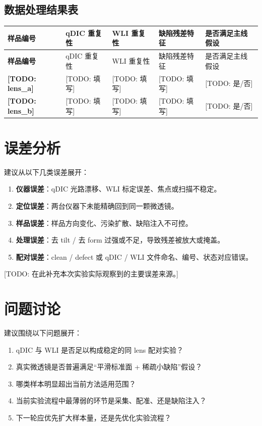 \documentclass[UTF8,a4paper,11pt]{ctexart}
\newcommand{\TODO}[1]{\textcolor{red!70!black}{[TODO: #1]}}
\begin{document}
\subsection{数据处理结果表}

\begin{longtable}{>{\bfseries}p{} p{} p{} p{} p{}}
\toprule
样品编号 & qDIC 重复性 & WLI 重复性 & 缺陷残差特征 & 是否满足主线假设 \\
\midrule
\endfirsthead
\toprule
样品编号 & qDIC 重复性 & WLI 重复性 & 缺陷残差特征 & 是否满足主线假设 \\
\midrule
\endhead
\TODO{lens\_a} & \TODO{填写} & \TODO{填写} & \TODO{填写} & \TODO{是/否} \\
\TODO{lens\_b} & \TODO{填写} & \TODO{填写} & \TODO{填写} & \TODO{是/否} \\
\bottomrule
\end{longtable}

\section{误差分析}

建议从以下几类误差展开：

\begin{enumerate}
  \item \textbf{仪器误差}：qDIC 光路漂移、WLI 标定误差、焦点或扫描不稳定。
  \item \textbf{定位误差}：两台仪器下未能精确回到同一颗微透镜。
  \item \textbf{样品误差}：样品方向变化、污染扩散、缺陷注入不可控。
  \item \textbf{处理误差}：去 tilt / 去 form 过强或不足，导致残差被放大或掩盖。
  \item \textbf{配对误差}：clean / defect 或 qDIC / WLI 文件命名、编号、状态对应错误。
\end{enumerate}

\TODO{在此补充本次实验实际观察到的主要误差来源。}

\section{问题讨论}

建议围绕以下问题展开：

\begin{enumerate}
  \item qDIC 与 WLI 是否足以构成稳定的同 lens 配对实验？
  \item 真实微透镜是否普遍满足“平滑标准面 + 稀疏小缺陷”假设？
  \item 哪类样本明显超出当前方法适用范围？
  \item 当前实验流程中最薄弱的环节是采集、配准、还是缺陷注入？
  \item 下一轮应优先扩大样本量，还是先优化实验流程？
\end{enumerate}
\end{document}
